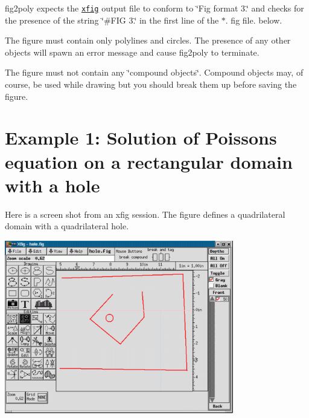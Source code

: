 \begin{DoxyItemize}
\item {\ttfamily fig2poly} expects the \href{http://en.wikipedia.org/wiki/Xfig}{\tt xfig} output file to conform to \char`\"{}\+Fig format 3.\char`\"{} and checks for the presence of the string \char`\"{}\#\+F\+I\+G 3.\char`\"{} in the first line of the {\ttfamily $\ast$}. {\ttfamily fig} file. below. ~\newline
~\newline

\item The figure must contain only polylines and circles. The presence of any other objects will spawn an error message and cause {\ttfamily fig2poly} to terminate. ~\newline
~\newline

\item The figure must not contain any \char`\"{}compound objects\char`\"{}. Compound objects may, of course, be used while drawing but you should break them up before saving the figure. ~\newline
~\newline

\end{DoxyItemize}



 

\hypertarget{index_hole_poisson}{}\section{Example 1\+: Solution of Poisson\textquotesingle{}s equation on a rectangular domain with a hole}\label{index_hole_poisson}
Here is a screen shot from an xfig session. The figure defines a quadrilateral domain with a quadrilateral hole.

 
\begin{DoxyImage}
\includegraphics[width=0.75\textwidth]{hole_screen_shot}
\end{DoxyImage}


